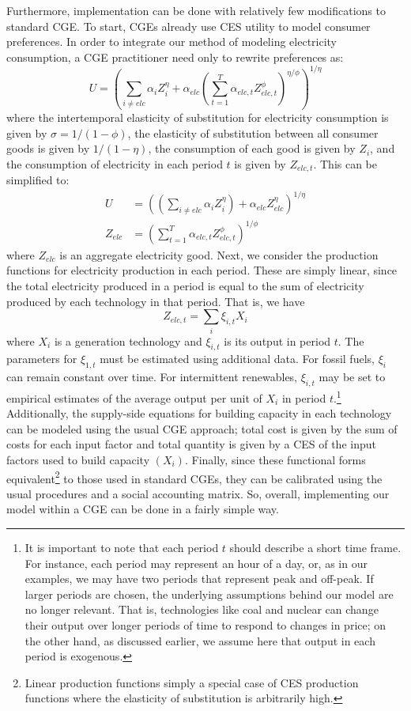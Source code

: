 \documentclass[11pt,a4paper,leqno]{extarticle}
\begin{document}
	Furthermore, implementation can be done with relatively few modifications to standard CGE. To start, CGEs already use CES utility to model consumer preferences. In order to integrate our method of modeling electricity consumption, a CGE practitioner need only to rewrite preferences as:
	\begin{equation}
	U =   \left( \sum_{i \neq elc} \alpha_{i} Z_{i}^\eta +  \alpha_{elc} \left( \sum_{t=1}^T \alpha_{elc,t} Z_{elc, t}^\phi \right)^{\eta/\phi} \right)^{1/\eta}
	\end{equation}
	where the intertemporal elasticity of substitution for electricity consumption is given by $\sigma = 1/(1-\phi)$,  the elasticity of substitution between all consumer goods is given by $1/(1-\eta)$, the consumption of each good is given by $Z_{i}$, and the consumption of electricity in each period $t$ is given by $Z_{elc, t}$. This can be simplified to: 
	\begin{align}
	U &= \left(  \left( \sum_{i \neq elc} \alpha_{i} Z_{i}^\eta \right) + \alpha_{elc} Z_{elc}^\eta \right)^{1/\eta} \\
	Z_{elc} &= \left(  \sum_{t=1}^T \alpha_{elc,t} Z_{elc, t}^\phi \right)^{1/\phi}
	\end{align}
	where $Z_{elc}$ is an aggregate electricity good. Next, we consider the production functions for electricity production in each period. These are simply linear, since the total  electricity produced in a period is equal to the sum of electricity produced by each technology in that period. That is, we have 
	\begin{equation}
	Z_{elc,t} = \sum_i \xi_{i,t} X_i 
	\end{equation}
	where $X_i$ is a generation technology and $\xi_{i,t}$ is its output in period $t$. The parameters for $\xi_{1,t}$ must be estimated using additional data. For fossil fuels, $\xi_i$ can remain constant over time. For intermittent renewables, $\xi_{i,t}$ may be set to empirical estimates of the average output per unit of $X_i$ in period $t$.\footnote{ It is important to note that each period $t$ should describe a short time frame. For instance, each period may represent an hour of a day, or, as in our examples, we may have two periods that represent peak and off-peak. If larger periods are chosen, the underlying assumptions behind our model are no longer relevant. That is, technologies like coal and nuclear can change their output over longer periods of time to respond to changes in price; on the other hand, as discussed earlier, we assume here that output in each period is exogenous.}  Additionally, the supply-side equations for building capacity in each technology can be modeled using the usual  CGE approach; total cost is given by the sum of costs for each input factor and total quantity is given by a CES of the input factors used to build capacity $(X_i)$. Finally, since these functional forms equivalent\footnote{ Linear production functions simply a special case of CES production functions where the elasticity of substitution is arbitrarily high.} to those used in standard CGEs, they can be calibrated using the usual procedures and a social accounting matrix. So, overall, implementing our model within a CGE can be done in a fairly simple way. 
	
\end{document}
